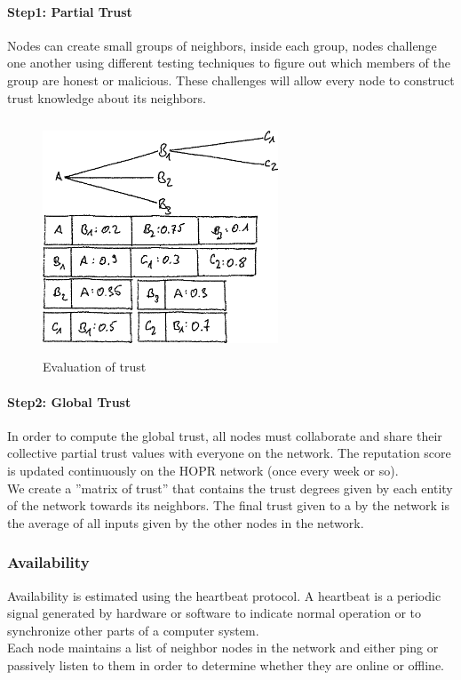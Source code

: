\paragraph{Step1: Partial Trust}
Nodes can create small groups of neighbors, inside each group, nodes challenge one another using different testing techniques to figure out which members of the group are honest or malicious. 
These challenges will allow every node to construct trust knowledge about its neighbors. 
\begin{figure}
    \centering
    \includegraphics[width=7cm,height=7cm,keepaspectratio]{../whitepaper/images/reputation.png}
    \caption{Evaluation of trust}
    \label{fig:Evaluation of trust}
\end{figure}

\paragraph{Step2: Global Trust}
In order to compute the global trust, all nodes must collaborate and share their collective partial trust values with everyone on the network. 
The reputation score is updated continuously on the HOPR network (once every week or so). 
\\We create a ”matrix of trust” that contains the trust degrees given by each entity of the network towards its neighbors. 
The final trust given to a by the network is the average of all inputs given by the other nodes in the network.
\subsubsection{Availability}
Availability is estimated using the heartbeat protocol. A heartbeat is a periodic signal generated by hardware or software to indicate normal operation or to synchronize other parts of a computer system.
\\ Each node maintains a list of neighbor nodes in the network and either ping or passively listen to them in order to determine whether they are online or offline.













    

